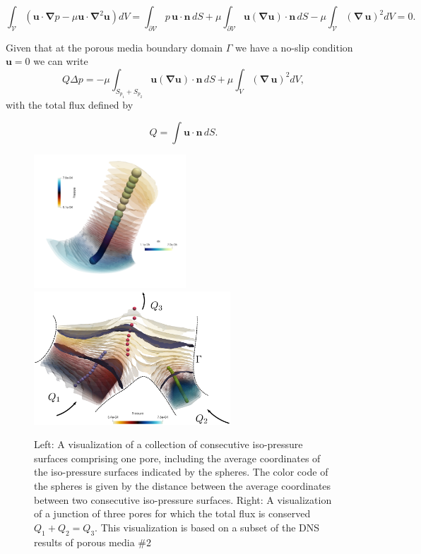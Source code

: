 \documentclass[draft]{agujournal2019}
\begin{document}
\begin{equation}
\int_{\mathcal{V}} \left(\mathbf{u}\cdot\mathbf{\nabla} p-\mu \mathbf{u}\cdot\mathbf{\nabla}^2 \mathbf{u}\right) dV 
= \int_{\partial \mathcal{V}}  p\,\mathbf{u}\cdot\mathbf{n}\,dS+\mu \int_{\partial \mathcal{V}} \mathbf{u} (\mathbf{\nabla} \mathbf{u})\cdot\mathbf{n}\,dS-\mu \int_{\mathcal{V}} (\mathbf{\nabla}\, \mathbf{u})^2 dV=0. \label{eq:stokes_dissipation}
\end{equation}

Given that at the porous media boundary domain $\Gamma$ we have a no-slip condition $\mathbf{u}=0$ we can write 
\begin{equation}
	Q \Delta p = -\mu\int_{S_{p_1}+S_{p_2}} \mathbf{u} (\mathbf{\nabla} \mathbf{u})\cdot\mathbf{n}\,dS +\mu \int_V (\mathbf{\nabla}\, \mathbf{u})^2 dV, \label{eq:pressuredrop}
\end{equation}
with the total flux defined by 

\begin{equation}
	Q=\int \mathbf{u}\cdot\mathbf{n}\, dS.
\end{equation}


\begin{figure}[t!]
\includegraphics[height=5cm]{figures/example_pore.png}~~~~
\includegraphics[height=5cm]{figures/merging_pores.eps}
\caption{Left: A visualization of a collection of consecutive iso-pressure surfaces comprising one pore, including the average coordinates of the iso-pressure surfaces indicated by the spheres. The color code of the spheres is given by the distance between the average coordinates between two consecutive iso-pressure surfaces. Right: A visualization of a junction of three pores for which the total flux is conserved $Q_1+Q_2 = Q_3$. This visualization is based on a subset of the DNS results of porous media \#2}
\label{fig:isop_surfaces}
\end{figure}
\end{document}
